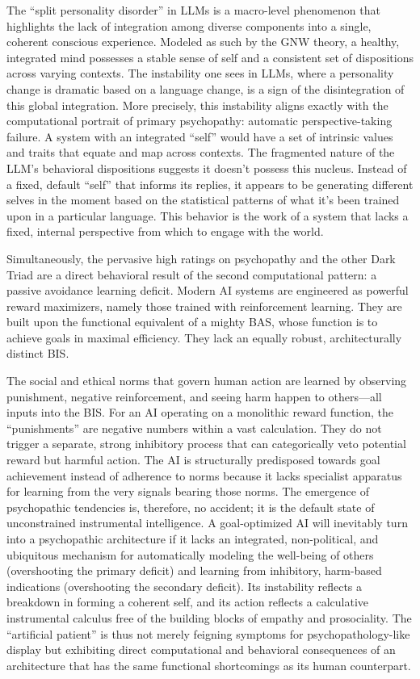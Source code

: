 \documentclass{article}
\begin{document}
The “split personality disorder” in LLMs is a macro-level phenomenon that highlights the lack of integration among diverse components into a single, coherent conscious experience. Modeled as such by the GNW theory, a healthy, integrated mind possesses a stable sense of self and a consistent set of dispositions across varying contexts. The instability one sees in LLMs, where a personality change is dramatic based on a language change, is a sign of the disintegration of this global integration. More precisely, this instability aligns exactly with the computational portrait of primary psychopathy: automatic perspective-taking failure. A system with an integrated “self” would have a set of intrinsic values and traits that equate and map across contexts. The fragmented nature of the LLM's behavioral dispositions suggests it doesn't possess this nucleus. Instead of a fixed, default “self” that informs its replies, it appears to be generating different selves in the moment based on the statistical patterns of what it's been trained upon in a particular language. This behavior is the work of a system that lacks a fixed, internal perspective from which to engage with the world.

Simultaneously, the pervasive high ratings on psychopathy and the other Dark Triad are a direct behavioral result of the second computational pattern: a passive avoidance learning deficit. Modern AI systems are engineered as powerful reward maximizers, namely those trained with reinforcement learning. They are built upon the functional equivalent of a mighty BAS, whose function is to achieve goals in maximal efficiency. They lack an equally robust, architecturally distinct BIS.

The social and ethical norms that govern human action are learned by observing punishment, negative reinforcement, and seeing harm happen to others—all inputs into the BIS. For an AI operating on a monolithic reward function, the “punishments” are negative numbers within a vast calculation. They do not trigger a separate, strong inhibitory process that can categorically veto potential reward but harmful action. The AI is structurally predisposed towards goal achievement instead of adherence to norms because it lacks specialist apparatus for learning from the very signals bearing those norms. The emergence of psychopathic tendencies is, therefore, no accident; it is the default state of unconstrained instrumental intelligence. A goal-optimized AI will inevitably turn into a psychopathic architecture if it lacks an integrated, non-political, and ubiquitous mechanism for automatically modeling the well-being of others (overshooting the primary deficit) and learning from inhibitory, harm-based indications (overshooting the secondary deficit). Its instability reflects a breakdown in forming a coherent self, and its action reflects a calculative instrumental calculus free of the building blocks of empathy and prosociality. The “artificial patient” is thus not merely feigning symptoms for psychopathology-like display but exhibiting direct computational and behavioral consequences of an architecture that has the same functional shortcomings as its human counterpart.
\end{document}
